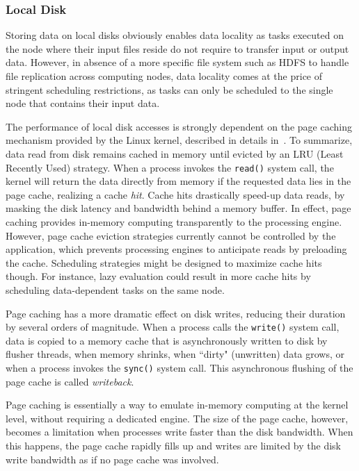 \documentclass{IEEEtran}
\begin{document}
\subsubsection{Local Disk} %


Storing data on local disks obviously enables data locality as tasks 
executed on the node where their input files reside do not require to 
transfer input or output data. However, in absence of a more specific 
file system such as HDFS to handle 
file replication across computing nodes, data locality comes at the price
of stringent scheduling restrictions, as tasks can only be scheduled to the
single node that contains their input data.


The performance of local disk accesses is strongly dependent on the 
page caching mechanism provided by the Linux kernel, described in    
details in~\cite{love2010linux}. To summarize, data read from disk 
remains cached in memory until evicted by an LRU (Least Recently Used) 
strategy. When a process invokes the \texttt{read()} system call, the 
kernel will return the data directly from memory if the requested data 
lies in the page cache, realizing a cache \emph{hit}. Cache hits drastically speed-up data 
reads, by masking the disk latency and bandwidth behind a 
memory buffer. In effect, page caching provides in-memory computing 
transparently to the processing engine. However, page cache eviction 
strategies currently cannot be controlled by the application, which 
prevents processing engines to anticipate reads by preloading the 
cache. Scheduling strategies might be designed 
to maximize cache hits though. For instance, lazy 
evaluation could result in more cache hits by scheduling data-dependent 
tasks on the same node.

Page caching has a more dramatic effect on disk writes, reducing their 
duration by several orders of magnitude. When a process calls the 
\texttt{write()} system call, data is copied to a memory cache that is 
asynchronously written to disk by flusher threads, when memory shrinks, when
``dirty" (unwritten) data grows, or when a 
process invokes the \texttt{sync()} system call. 
This asynchronous flushing of the page cache is called 
\emph{writeback}.

Page caching is essentially a way to 
emulate in-memory computing at the kernel level, without requiring a 
dedicated engine. The size of the page cache, however, becomes a 
limitation when processes write faster than the disk bandwidth. When 
this happens, the page cache rapidly fills up and writes are limited by 
the disk write bandwidth as if no page cache was involved.
\end{document}
